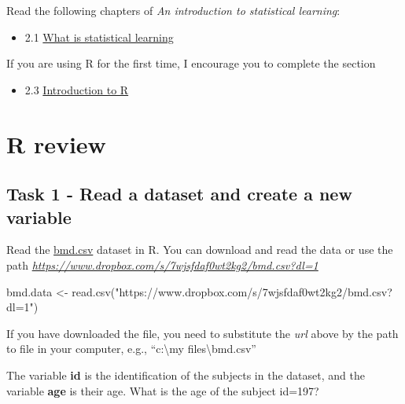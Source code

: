 \documentclass[
]{book}
\newenvironment{Shaded}{\begin{snugshade}}{\end{snugshade}}
\newcommand{\FunctionTok}[1]{\textcolor[rgb]{0.00,0.00,0.00}{#1}}
\newcommand{\NormalTok}[1]{#1}
\newcommand{\OtherTok}[1]{\textcolor[rgb]{0.56,0.35,0.01}{#1}}
\newcommand{\StringTok}[1]{\textcolor[rgb]{0.31,0.60,0.02}{#1}}
\providecommand{\tightlist}{%
  \setlength{\itemsep}{0pt}\setlength{\parskip}{0pt}}
\begin{document}
Read the following chapters of \emph{An introduction to statistical learning}:

\begin{itemize}
\tightlist
\item
  2.1 \href{http://faculty.marshall.usc.edu/gareth-james/ISL/ISLR\%20Seventh\%20Printing.pdf\#page=28}{What is statistical learning}
\end{itemize}

If you are using R for the first time, I encourage you to complete the section

\begin{itemize}
\tightlist
\item
  2.3 \href{http://faculty.marshall.usc.edu/gareth-james/ISL/ISLR\%20Seventh\%20Printing.pdf\#page=5}{Introduction to R}
\end{itemize}

\hypertarget{r-review}{%
\section{R review}\label{r-review}}

\hypertarget{task-1---read-a-dataset-and-create-a-new-variable}{%
\subsection*{Task 1 - Read a dataset and create a new variable}\label{task-1---read-a-dataset-and-create-a-new-variable}}

Read the \href{https://www.dropbox.com/s/7wjsfdaf0wt2kg2/bmd.csv?dl=1}{bmd.csv}
dataset in R. You can download and read the data or use the path \emph{\url{https://www.dropbox.com/s/7wjsfdaf0wt2kg2/bmd.csv?dl=1}}

\begin{Shaded}
\begin{Highlighting}[]
\NormalTok{bmd.data }\OtherTok{\textless{}{-}} \FunctionTok{read.csv}\NormalTok{(}\StringTok{"https://www.dropbox.com/s/7wjsfdaf0wt2kg2/bmd.csv?dl=1"}\NormalTok{)}
\end{Highlighting}
\end{Shaded}

If you have downloaded the file, you need to substitute the \emph{url} above by
the path to file in your computer, e.g., ``c:\textbackslash my files\textbackslash bmd.csv''

The variable \textbf{id} is the identification of the subjects in the dataset, and
the variable \textbf{age} is their age. What is the age of the subject id=197?
\end{document}
